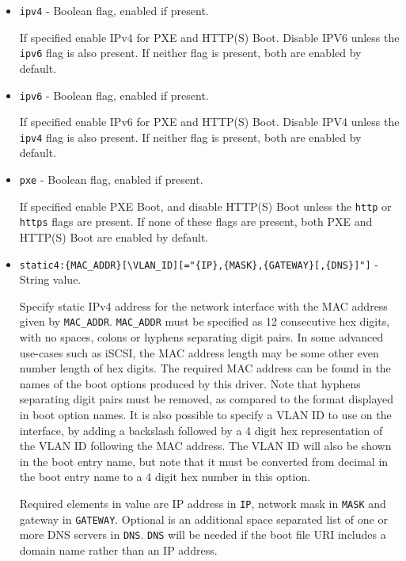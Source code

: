 \documentclass[]{article}
\begin{document}
\begin{itemize}
  \item \texttt{ipv4} - Boolean flag, enabled if present. \medskip

  If specified enable IPv4 for PXE and HTTP(S) Boot. Disable IPV6
  unless the \texttt{ipv6} flag is also present. If neither flag is
  present, both are enabled by default. \medskip

  \item \texttt{ipv6} - Boolean flag, enabled if present. \medskip

  If specified enable IPv6 for PXE and HTTP(S) Boot. Disable IPV4
  unless the \texttt{ipv4} flag is also present. If neither flag is
  present, both are enabled by default. \medskip

  \item \texttt{pxe} - Boolean flag, enabled if present. \medskip

  If specified enable PXE Boot, and disable HTTP(S) Boot unless
  the \texttt{http} or \texttt{https} flags are present.
  If none of these flags are present, both PXE and HTTP(S) Boot are
  enabled by default. \medskip

  \item \texttt{static4:\{MAC\_ADDR\}[\textbackslash VLAN\_ID][="\{IP\},\{MASK\},\{GATEWAY\}[,\{DNS\}]"]} - String value. \medskip

  Specify static IPv4 address for the network interface with the MAC address given by \texttt{MAC\_ADDR}. \texttt{MAC\_ADDR}
  must be specified as 12 consecutive hex digits, with no spaces, colons or hyphens separating digit pairs. In some advanced
  use-cases such as iSCSI, the MAC address length may be some other even number length of hex digits. The required
  MAC address can be found in the names of the boot options produced by this driver. Note that
  hyphens separating digit pairs must be removed, as compared to the format displayed in boot option names.
  It is also possible to specify a VLAN ID to use on the interface, by adding a backslash
  followed by a 4 digit hex representation of the VLAN ID following the MAC address. The VLAN ID will also be
  shown in the boot entry name, but note that it must be converted from decimal in the boot entry name to a
  4 digit hex number in this option.

  Required elements in value are IP address in \texttt{IP}, network mask in \texttt{MASK}
  and gateway in \texttt{GATEWAY}. Optional is an additional space separated list of one or more DNS servers
  in \texttt{DNS}. \texttt{DNS} will be needed if the boot file URI includes a domain name rather than an IP address.
  

\end{itemize}
\end{document}
